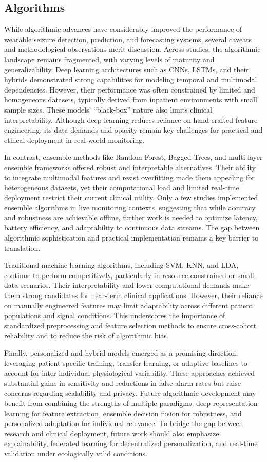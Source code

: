 \subsection{Algorithms}
While algorithmic advances have considerably improved the performance of wearable seizure detection, prediction, and forecasting systems, several caveats and methodological observations merit discussion. Across studies, the algorithmic landscape remains fragmented, with varying levels of maturity and generalizability. Deep learning architectures such as CNNs, LSTMs, and their hybrids demonstrated strong capabilities for modeling temporal and multimodal dependencies. However, their performance was often constrained by limited and homogeneous datasets, typically derived from inpatient environments with small sample sizes. These models’ “black-box” nature also limits clinical interpretability. Although deep learning reduces reliance on hand-crafted feature engineering, its data demands and opacity remain key challenges for practical and ethical deployment in real-world monitoring.

In contrast, ensemble methods like Random Forest, Bagged Trees, and multi-layer ensemble frameworks offered robust and interpretable alternatives. Their ability to integrate multimodal features and resist overfitting made them appealing for heterogeneous datasets, yet their computational load and limited real-time deployment restrict their current clinical utility. Only a few studies implemented ensemble algorithms in live monitoring contexts, suggesting that while accuracy and robustness are achievable offline, further work is needed to optimize latency, battery efficiency, and adaptability to continuous data streams. The gap between algorithmic sophistication and practical implementation remains a key barrier to translation.

Traditional machine learning algorithms, including SVM, KNN, and LDA, continue to perform competitively, particularly in resource-constrained or small-data scenarios. Their interpretability and lower computational demands make them strong candidates for near-term clinical applications. However, their reliance on manually engineered features may limit adaptability across different patient populations and signal conditions. This underscores the importance of standardized preprocessing and feature selection methods to ensure cross-cohort reliability and to reduce the risk of algorithmic bias.

Finally, personalized and hybrid models emerged as a promising direction, leveraging patient-specific training, transfer learning, or adaptive baselines to account for inter-individual physiological variability. These approaches achieved substantial gains in sensitivity and reductions in false alarm rates but raise concerns regarding scalability and privacy. Future algorithmic development may benefit from combining the strengths of multiple paradigms, deep representation learning for feature extraction, ensemble decision fusion for robustness, and personalized adaptation for individual relevance. To bridge the gap between research and clinical deployment, future work should also emphasize explainability, federated learning for decentralized personalization, and real-time validation under ecologically valid conditions.
